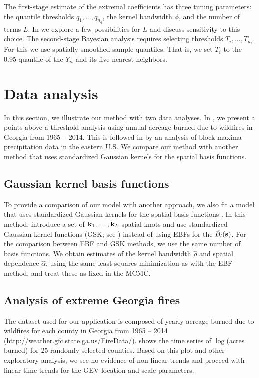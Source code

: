 The first-stage estimate of the extremal coefficients has three tuning parameters: the quantile thresholds $q_1,\ldots,q_{n_q}$, the kernel bandwidth $\phi$, and the number of terms $L$.
In  we explore a few possibilities for $L$ and discuss sensitivity to this choice.
The second-stage Bayesian analysis requires selecting thresholds $T_i,\ldots,T_{n_s}$.  For this we use spatially smoothed sample quantiles.
That is, we set $T_i$ to the 0.95 quantile of the $Y_{it}$ and its five nearest neighbors.

\section{Data analysis}\label{ebs:analysis}
In this section, we illustrate our method with two data analyses.
In , we present a points above a threshold analysis using annual acreage burned due to wildfires in Georgia from 1965 -- 2014.
This is followed in  by an analysis of block maxima precipitation data in the eastern U.S.
We compare our method with another method that uses standardized Gaussian kernels for the spatial basis functions.

\subsection{Gaussian kernel basis functions}
To provide a comparison of our model with another approach, we also fit a model that uses standardized Gaussian kernels for the spatial basis functions \citep{Reich2012}.
In this method, \citeauthor{Reich2012} introduce a set of $\mathbf{k}_1, \ldots, \mathbf{k}_L$ spatial knots and use standardized Gaussian kernel functions (GSK; see ) instead of using EBFs for the $\hat{B_l}(\mathbf{s})$.
For the comparison between EBF and GSK methods, we use the same number of basis functions.
We obtain estimates of the kernel bandwidth $\hat{\rho}$ and spatial dependence $\hat{\alpha}$, using the same least squares minimization as with the EBF method, and treat these as fixed in the MCMC.

\subsection{Analysis of extreme Georgia fires}\label{ebs:georgia}
The dataset used for our application is composed of yearly acreage burned due to wildfires for each county in Georgia from 1965 -- 2014 (\url{http://weather.gfc.state.ga.us/FireData/}).
 shows the time series of $\log$(acres burned) for 25 randomly selected counties.
Based on this plot and other exploratory analysis, we see no evidence of non-linear trends and proceed with linear time trends for the GEV location and scale parameters.

